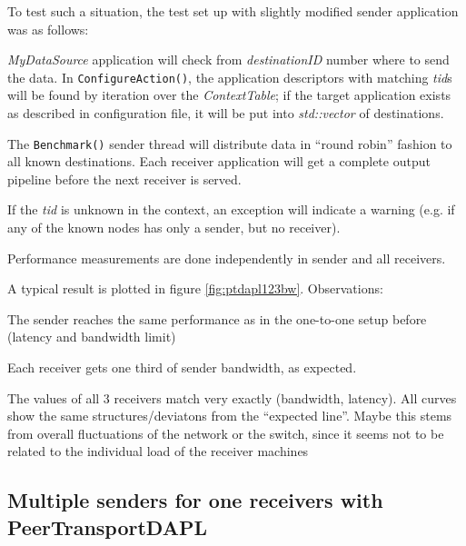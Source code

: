 To test such a situation, the test set up with slightly modified
sender application was as follows:

\begin{compactitem}
\item {\em MyDataSource} application will check from {\em destinationID}  
number where to send the data. 
In {\tt ConfigureAction()}, the application descriptors with 
matching {\em tid}s will be found by iteration over the {\em ContextTable}; 
if the target application exists as described in configuration file, 
it will be put into {\em std::vector} of destinations. 

\item The {\tt Benchmark()} sender thread will distribute 
data in ``round robin'' fashion to all known destinations. 
Each receiver application will get a complete output pipeline 
before the next receiver is served. 

\item If the {\em tid} is unknown in the context, an exception will 
indicate a warning 
(e.g. if any of the known nodes has only a sender, but no receiver). 

\item Performance measurements are done independently in sender and all receivers. 

\end{compactitem}



A typical result is plotted in figure \ref{fig:ptdapl123bw}.
Observations:
 \begin{compactitem}
\item The sender reaches the same performance as in the one-to-one setup 
before (latency and bandwidth limit)
 
\item Each receiver gets one third of sender bandwidth, as expected.
 
\item The values of all 3 receivers match very exactly (bandwidth, latency). 
All curves show the same structures/deviatons from the ``expected line''. 
Maybe this stems from overall fluctuations of the network or the switch, 
since it  seems not to be related to the individual load of the
receiver machines 
 \end{compactitem}

\clearpage
\subsection{Multiple senders for one receivers with PeerTransportDAPL}
\label{ptDAPL-MultSendRec}

